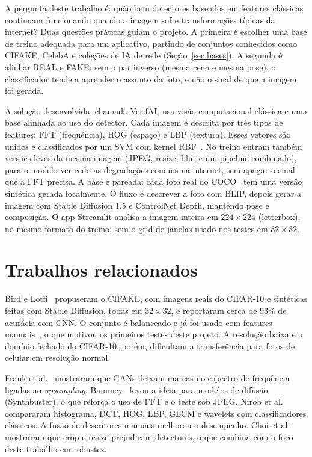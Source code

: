 \documentclass[12pt]{article}
\begin{document}
A pergunta deste trabalho é: quão bem detectores baseados em features clássicas continuam funcionando quando a imagem sofre transformações típicas da internet? Duas questões práticas guiam o projeto. A primeira é escolher uma base de treino adequada para um aplicativo, partindo de conjuntos conhecidos como CIFAKE, CelebA e coleções de IA de rede (Seção~\ref{sec:bases}). A segunda é alinhar REAL e FAKE: sem o par inverso (mesma cena e mesma pose), o classificador tende a aprender o assunto da foto, e não o sinal de que a imagem foi gerada.

A solução desenvolvida, chamada VerifAI, usa visão computacional clássica e uma base alinhada ao uso do detector. Cada imagem é descrita por três tipos de features: FFT (frequência), HOG (espaço) e LBP (textura). Esses vetores são unidos e classificados por um SVM com kernel RBF~\cite{cortes1995svm,dalal2005hog,ojala2002lbp,gonzalez2018}. No treino entram também versões leves da mesma imagem (JPEG, resize, blur e um pipeline combinado), para o modelo ver cedo as degradações comuns na internet, sem apagar o sinal que a FFT precisa. A base é pareada: cada foto real do COCO~\cite{coco2017} tem uma versão sintética gerada localmente. O fluxo é descrever a foto com BLIP, depois gerar a imagem com Stable Diffusion 1.5 e ControlNet Depth, mantendo pose e composição. O app Streamlit analisa a imagem inteira em $224{\times}224$ (letterbox), no mesmo formato do treino, sem o grid de janelas usado nos testes em $32{\times}32$.

\section{Trabalhos relacionados}

Bird e Lotfi~\cite{bird2024cifake} propuseram o CIFAKE, com imagens reais do CIFAR-10 e sintéticas feitas com Stable Diffusion, todas em $32{\times}32$, e reportaram cerca de 93\% de acurácia com CNN. O conjunto é balanceado e já foi usado com features manuais~\cite{nirob2026handcrafted}, o que motivou os primeiros testes deste projeto. A resolução baixa e o domínio fechado do CIFAR-10, porém, dificultam a transferência para fotos de celular em resolução normal.

Frank et al.~\cite{frank2020frequency} mostraram que GANs deixam marcas no espectro de frequência ligadas ao \emph{upsampling}. Bammey~\cite{bammey2024synthbuster} levou a ideia para modelos de difusão (Synthbuster), o que reforça o uso de FFT e o teste sob JPEG. Nirob et al.~\cite{nirob2026handcrafted} compararam histograma, DCT, HOG, LBP, GLCM e wavelets com classificadores clássicos. A fusão de descritores manuais melhorou o desempenho. Choi et al.~\cite{choi2025warpad} mostraram que crop e resize prejudicam detectores, o que combina com o foco deste trabalho em robustez.
\end{document}
